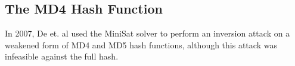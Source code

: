 \subsection{The MD4 Hash Function}

\label{sec:encoding:md4}

In 2007, De et. al \cite{DKV07} used the MiniSat solver to perform an inversion attack on a weakened form of MD4 and MD5 hash functions, although this attack was infeasible against the full hash.
